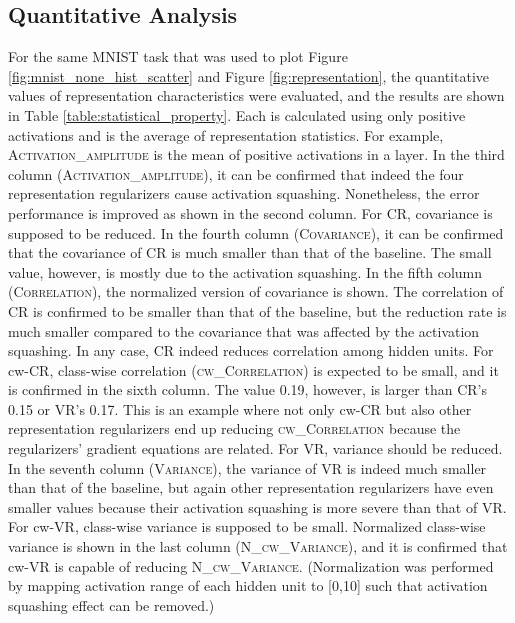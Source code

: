 \subsection{Quantitative Analysis}
For the same MNIST task that was used to plot Figure \ref{fig:mnist_none_hist_scatter} and Figure \ref{fig:representation}, the quantitative values of representation characteristics were evaluated, and the results are shown in Table \ref{table:statistical_property}. Each is calculated using only positive activations and is the average of representation statistics. For example, \textsc{Activation\_amplitude} is the mean of positive activations in a layer.
In the third column (\textsc{Activation\_amplitude}), it can be confirmed that indeed the four representation regularizers cause activation squashing. Nonetheless, the error performance is improved as shown in the second column. For CR, covariance is supposed to be reduced. In the fourth column (\textsc{Covariance}), it can be confirmed that the covariance of CR is much smaller than that of the baseline. The small value, however, is mostly due to the activation squashing. In the fifth column (\textsc{Correlation}), the normalized version of covariance is shown. The correlation of CR is confirmed to be smaller than that of the baseline, but the reduction rate is much smaller compared to the covariance that was affected by the activation squashing. In any case, CR indeed reduces correlation among hidden units. For cw-CR, class-wise correlation (\textsc{cw\_Correlation}) is expected to be small, and it is confirmed in the sixth column. The value 0.19, however, is larger than CR's 0.15 or VR's 0.17. This is an example where not only cw-CR but also other representation regularizers end up reducing \textsc{cw\_Correlation} because the regularizers' gradient equations are related. For VR, variance should be reduced. In the seventh column (\textsc{Variance}), the variance of VR is indeed much smaller than that of the baseline, but again other representation regularizers have even smaller values because their activation squashing is more severe than that of VR. For cw-VR, class-wise variance is supposed to be small. Normalized class-wise variance is shown in the last column (\textsc{N\_cw\_Variance}), and it is confirmed that cw-VR is capable of reducing \textsc{N\_cw\_Variance}. (Normalization was performed by mapping activation range of each hidden unit to [0,10] such that activation squashing effect can be removed.)  




